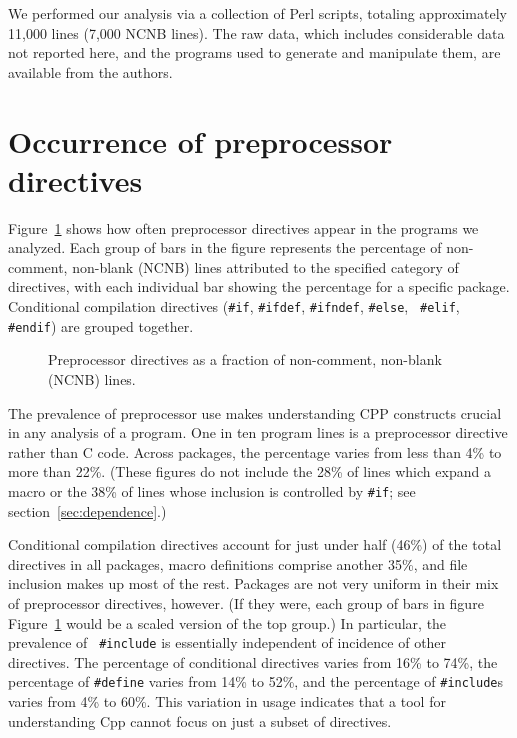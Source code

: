 \documentclass[10pt]{article}
\begin{document}
We performed our analysis via a collection of Perl scripts, totaling
approximately 11,000 lines (7,000 NCNB lines).  The raw data, which
includes considerable data not reported here, and the programs used to
generate and manipulate them, are available from the authors.







\section{Occurrence of preprocessor directives}
\label{sec:directives}
\label{sec:first-content-section}

Figure~\ref{fig:directives-breakdown} shows how often preprocessor
directives appear in the programs we analyzed.  Each group of bars in the
figure represents the percentage of non-comment, non-blank (NCNB) lines
attributed to the specified category of directives, with each individual
bar showing the percentage for a specific package.  Conditional compilation
directives ({\tt \#if}, {\tt \#ifdef}, {\tt \#ifndef}, {\tt \#else}, {\tt
\#elif}, {\tt \#endif}) are grouped together.

\begin{figure}
\centerline{}
\caption{Preprocessor directives as a fraction of non-comment,
  non-blank (NCNB) lines.}
\label{fig:directives-breakdown}
\end{figure}

The prevalence of preprocessor use makes understanding CPP constructs
crucial in any analysis of a program.  One in ten program lines is a
preprocessor directive rather than C code.  Across
packages, the percentage varies from less than 4\% to more than 22\%.
(These figures do not include the 28\% of lines which expand a macro or the
38\% of lines whose inclusion is controlled by {\tt \#if}; see
section~\ref{sec:dependence}.)


Conditional compilation directives account for just under half (46\%) of
the total directives in all packages, macro definitions comprise another
35\%, and file inclusion makes up most of the rest.  Packages are not very
uniform in their mix of preprocessor directives, however.  (If they were,
each group of bars in figure Figure~\ref{fig:directives-breakdown} would be
a scaled version of the top group.)  In particular, the prevalence of {\tt
\#include} is essentially independent of incidence of other directives.
The percentage of conditional directives varies from 16\% to 74\%, the
percentage of {\tt \#define} varies from 14\% to 52\%, and the percentage
of {\tt \#include}s varies from 4\% to 60\%.  This variation in usage
indicates that a tool for understanding Cpp cannot focus on just a subset
of directives.  
\end{document}
